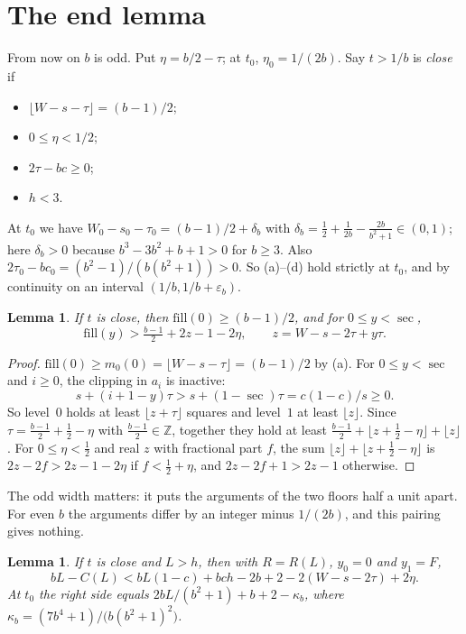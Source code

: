 \documentclass[11pt,letterpaper]{amsart}
\theoremstyle{plain}
\newtheorem{lemma}[theorem]{Lemma}
\theoremstyle{remark}
\newcommand{\fl}[1]{\lfloor #1 \rfloor}
\begin{document}
\section{The end lemma}

From now on $b$ is odd. Put $\eta=b/2-\tau$; at $t_0$, $\eta_0=1/(2b)$. Say $t>1/b$ is \emph{close} if
\begin{itemize}
\item[(a)] $\fl{W-s-\tau}=(b-1)/2$;
\item[(b)] $0\le\eta<1/2$;
\item[(c)] $2\tau-bc\ge0$;
\item[(d)] $h<3$.
\end{itemize}
At $t_0$ we have $W_0-s_0-\tau_0=(b-1)/2+\delta_b$ with $\delta_b=\tfrac12+\tfrac1{2b}-\tfrac{2b}{b^2+1}\in(0,1)$; here $\delta_b>0$ because $b^3-3b^2+b+1>0$ for $b\ge3$. Also $2\tau_0-bc_0=(b^2-1)/(b(b^2+1))>0$. So (a)--(d) hold strictly at $t_0$, and by continuity on an interval $(1/b,1/b+\varepsilon_b)$.

\begin{lemma}\label{lem:fill}
If $t$ is close, then $\mathrm{fill}(0)\ge(b-1)/2$, and for $0\le y<\sec$,
\[
\mathrm{fill}(y)>\tfrac{b-1}{2}+2z-1-2\eta,\qquad z=W-s-2\tau+y\tau.
\]
\end{lemma}

\begin{proof}
$\mathrm{fill}(0)\ge m_0(0)=\fl{W-s-\tau}=(b-1)/2$ by (a). For $0\le y<\sec$ and $i\ge0$, the clipping in $a_i$ is inactive:
\[
s+(i+1-y)\tau>s+(1-\sec)\tau=c(1-c)/s\ge0.
\]
So level~$0$ holds at least $\fl{z+\tau}$ squares and level~$1$ at least $\fl z$. Since $\tau=\frac{b-1}2+\frac12-\eta$ with $\frac{b-1}2\in\mathbb Z$, together they hold at least $\frac{b-1}2+\fl{z+\frac12-\eta}+\fl z$. For $0\le\eta<\frac12$ and real $z$ with fractional part $f$, the sum $\fl z+\fl{z+\frac12-\eta}$ is $2z-2f>2z-1-2\eta$ if $f<\frac12+\eta$, and $2z-2f+1>2z-1$ otherwise.
\end{proof}

The odd width matters: it puts the arguments of the two floors half a unit apart. For even $b$ the arguments differ by an integer minus $1/(2b)$, and this pairing gives nothing.

\begin{lemma}\label{lem:band}
If $t$ is close and $L>h$, then with $R=R(L)$, $y_0=0$ and $y_1=F$,
\begin{equation}\label{eq:band}
bL-C(L)<bL(1-c)+bch-2b+2-2(W-s-2\tau)+2\eta.
\end{equation}
At $t_0$ the right side equals $2bL/(b^2+1)+b+2-\kappa_b$, where $\kappa_b=(7b^4+1)/\bigl(b(b^2+1)^2\bigr)$.
\end{lemma}
\end{document}
